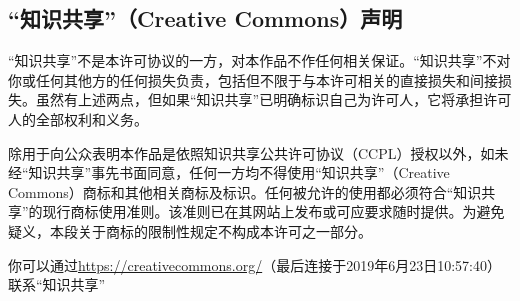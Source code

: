 \subsection{“知识共享”（Creative Commons）声明}
“知识共享”不是本许可协议的一方，对本作品不作任何相关保证。“知识共享”不对你或任何其他方的任何损失负责，包括但不限于与本许可相关的直接损失和间接损失。虽然有上述两点，但如果“知识共享”已明确标识自己为许可人，它将承担许可人的全部权利和义务。\par
除用于向公众表明本作品是依照知识共享公共许可协议（CCPL）授权以外，如未经“知识共享”事先书面同意，任何一方均不得使用“知识共享”（Creative Commons）商标和其他相关商标及标识。任何被允许的使用都必须符合“知识共享”的现行商标使用准则。该准则已在其网站上发布或可应要求随时提供。为避免疑义，本段关于商标的限制性规定不构成本许可之一部分。\par
你可以通过\url{https://creativecommons.org/}（最后连接于2019年6月23日10:57:40）联系“知识共享”